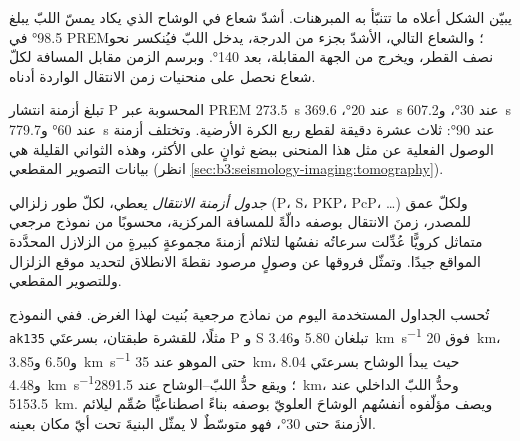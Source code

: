 يبيّن الشكل أعلاه ما تتنبّأ به المبرهنات. أشدّ شعاع في الوشاح الذي
يكاد يمسّ اللبّ يبلغ \ang{98.5} في PREM؛ والشعاع التالي، الأشدّ بجزء من
الدرجة، يدخل اللبّ فيُنكسر نحو نصف القطر، ويخرج
من الجهة المقابلة، بعد \ang{140}. وبرسم الزمن مقابل المسافة لكلّ شعاع
نحصل على منحنيات زمن الانتقال الواردة أدناه.

تبلغ أزمنة انتشار P المحسوبة عبر PREM \qty{273.5}{s} عند \ang{20}،
\qty{369.6}{s} عند \ang{30}، و\qty{607.2}{s} عند \ang{60} و\qty{779.7}{s} عند
\ang{90}: ثلاث عشرة دقيقة لقطع ربع الكرة الأرضية.
وتختلف أزمنة الوصول الفعلية عن مثل هذا المنحنى ببضع ثوانٍ على الأكثر، وهذه الثواني القليلة
هي بيانات التصوير المقطعي (انظر \cref{sec:b3:seismology-imaging:tomography}).

\begin{definition}\label{def:b3:seismology-imaging:tables}
\emph{جدول أزمنة الانتقال} يعطي، لكلّ طور زلزالي
(P، S، PKP، PcP، \dots) ولكلّ عمق للمصدر، زمنَ الانتقال بوصفه
دالّةً للمسافة المركزية، محسوبًا من نموذج مرجعي متماثل كرويًّا
عُدِّلت سرعاتُه نفسُها لتلائم أزمنةَ
مجموعةٍ كبيرةٍ من الزلازل المحدَّدة المواقع جيدًا. وتمثّل فروقها عن
وصولٍ مرصود نقطةَ الانطلاق لتحديد موقع الزلزال وللتصوير المقطعي.
\end{definition}

تُحسب الجداول المستخدمة اليوم من نماذج مرجعية بُنيت لهذا
الغرض. ففي النموذج \texttt{ak135} مثلًا، للقشرة طبقتان،
بسرعتَي P و S تبلغان 5.80 و\qty{3.46}{km.s^{-1}} فوق \qty{20}{km}،
و6.50 و\qty{3.85}{km.s^{-1}} حتى الموهو عند \qty{35}{km}، حيث
يبدأ الوشاح بسرعتَي 8.04 و\qty{4.48}{km.s^{-1}}؛ ويقع حدُّ اللبّ--الوشاح
عند \qty{2891.5}{km}، وحدُّ اللبّ الداخلي عند \qty{5153.5}{km}.
ويصف مؤلّفوه أنفسُهم الوشاحَ العلويّ بوصفه بناءً اصطناعيًّا
صُمِّم ليلائم الأزمنةَ حتى \ang{30}، فهو متوسّطٌ لا يمثّل البنيةَ
تحت أيّ مكان بعينه.

